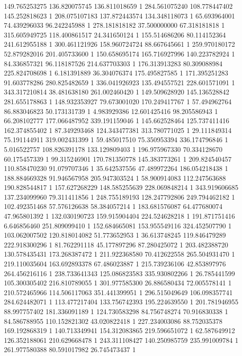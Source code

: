 149.765253275	136.820075745	136.811018659	1
284.561075240	108.778447402	145.252818623	1
208.075107183	137.872443574	134.348118073	1
65.693964001	74.439296033	96.242245988	1
278.181818182	37.500000000	67.318181818	1
315.605949725	118.400861517	24.341650124	1
155.514686206	80.114152364	241.612955188	1
300.461121926	158.960724724	88.667645661	1
259.970180172	52.879282016	201.405733600	1
150.658695174	165.716927996	140.223782924	1
84.336857321	96.118187526	214.637703303	1
176.313913283	80.309088984	225.824708698	1
6.181391889	36.304076374	175.495827585	1
171.395251283	91.603778286	280.825482659	1
336.041926923	135.494557521	228.601571091	1
343.317210814	38.481638180	261.002460420	1
149.509628920	145.136528842	281.655178863	1
148.932353927	79.673001020	170.249417767	1
57.494962764	86.883046823	50.173131739	1
4.983929386	12.601425416	98.205586943	1
66.208102777	177.066487952	339.191159046	1
145.662528464	125.737411416	162.374855402	1
87.349293468	124.343477381	313.780771025	1
29.111849314	75.191144911	319.002431399	1
59.485017510	75.350953394	336.174796846	1
5.016522757	108.826391178	133.129809403	1
196.975967330	70.334128670	60.175457339	1
99.315246901	170.781350778	145.383773261	1
209.824540457	110.858470230	91.079707346	1
35.642537556	47.489972264	186.054218438	1
188.884669328	91.946567958	205.947303524	1
58.900914083	112.247563688	190.828544817	1
157.627268229	148.585255639	228.069848214	1
343.919606685	137.234099960	79.311411856	1
248.755189193	128.247792806	249.794462182	1
102.492351468	57.576126638	58.384057214	1
183.681576087	64.477680074	47.965801392	1
132.030190723	159.915904404	224.524628218	1
191.871751416	6.646856460	251.809099410	1
152.684665081	153.955549116	324.452507790	1
103.062007502	120.818014082	51.773652953	1
36.613748245	119.846479289	222.918300296	1
81.762291118	45.177897296	87.280425072	1
203.482388720	130.578435431	173.268387472	1
211.922368580	70.412622558	265.504931470	1
219.110035604	163.692893378	67.486023887	1
215.739236106	42.853897976	264.456216116	1
238.733641343	125.086823583	335.930802266	1
26.785441599	105.300305402	216.810789055	1
301.977585300	26.886580434	72.005578141	1
210.572465966	114.506117063	351.441399951	1
296.515049649	106.098357741	284.624482071	1
113.477217404	133.756742393	195.224639550	1
201.781946955	88.997757402	181.336091189	1
124.730583298	84.756748274	70.916830338	1
84.586788955	110.152821302	43.020822418	1
227.234003086	88.752035378	169.192868319	1
140.713349941	154.312083865	219.596651072	1
62.587649912	126.352188061	210.629668478	1
243.311108427	140.250985759	235.991009784	1
261.977580388	80.591017982	26.745473437	1
